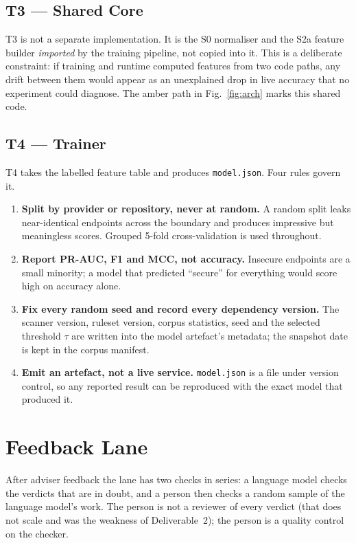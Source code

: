 \documentclass[conference]{IEEEtran}
\begin{document}
\subsection{T3 --- Shared Core}
T3 is not a separate implementation. It is the S0 normaliser and the S2a feature builder
\emph{imported} by the training pipeline, not copied into it. This is a deliberate
constraint: if training and runtime computed features from two code paths, any drift between
them would appear as an unexplained drop in live accuracy that no experiment could diagnose.
The amber path in Fig.~\ref{fig:arch} marks this shared code.

\subsection{T4 --- Trainer}
T4 takes the labelled feature table and produces \texttt{model.json}. Four rules govern it.

\begin{enumerate}
\item \textbf{Split by provider or repository, never at random.} A random split leaks
near-identical endpoints across the boundary and produces impressive but meaningless scores.
Grouped 5-fold cross-validation is used throughout.
\item \textbf{Report PR-AUC, F1 and MCC, not accuracy.} Insecure endpoints are a small
minority; a model that predicted ``secure'' for everything would score high on accuracy
alone.
\item \textbf{Fix every random seed and record every dependency version.} The scanner version,
ruleset version, corpus statistics, seed and the selected threshold $\tau$ are written
into the model artefact's metadata; the snapshot date is kept in the corpus manifest.
\item \textbf{Emit an artefact, not a live service.} \texttt{model.json} is a file under
version control, so any reported result can be reproduced with the exact model that produced
it.
\end{enumerate}

\section{Feedback Lane}
\label{sec:feedback}
After adviser feedback the lane has two checks in series: a language model checks the verdicts that are in doubt, and a person
then checks a random sample of the language model's work. The person is not a reviewer of every verdict (that does not scale
and was the weakness of Deliverable~2); the person is a quality control on the checker.
\end{document}
